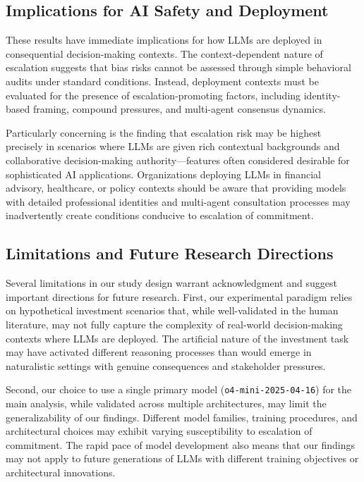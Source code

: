 \documentclass[letterpaper]{article} %
\begin{document}
\subsection{Implications for AI Safety and Deployment}

These results have immediate implications for how LLMs are deployed in consequential decision-making contexts. The context-dependent nature of escalation suggests that bias risks cannot be assessed through simple behavioral audits under standard conditions. Instead, deployment contexts must be evaluated for the presence of escalation-promoting factors, including identity-based framing, compound pressures, and multi-agent consensus dynamics.

Particularly concerning is the finding that escalation risk may be highest precisely in scenarios where LLMs are given rich contextual backgrounds and collaborative decision-making authority---features often considered desirable for sophisticated AI applications. Organizations deploying LLMs in financial advisory, healthcare, or policy contexts should be aware that providing models with detailed professional identities and multi-agent consultation processes may inadvertently create conditions conducive to escalation of commitment.

\subsection{Limitations and Future Research Directions}

Several limitations in our study design warrant acknowledgment and suggest important directions for future research. First, our experimental paradigm relies on hypothetical investment scenarios that, while well-validated in the human literature, may not fully capture the complexity of real-world decision-making contexts where LLMs are deployed. The artificial nature of the investment task may have activated different reasoning processes than would emerge in naturalistic settings with genuine consequences and stakeholder pressures.

Second, our choice to use a single primary model (\texttt{o4-mini-2025-04-16}) for the main analysis, while validated across multiple architectures, may limit the generalizability of our findings. Different model families, training procedures, and architectural choices may exhibit varying susceptibility to escalation of commitment. The rapid pace of model development also means that our findings may not apply to future generations of LLMs with different training objectives or architectural innovations.
\end{document}

